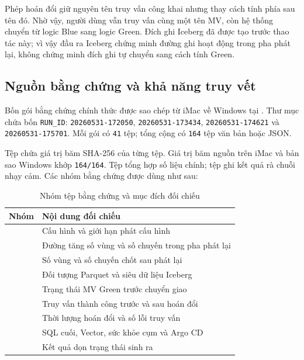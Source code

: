 Phép hoán đổi giữ nguyên tên truy vấn công khai nhưng thay cách tính phía sau tên đó. Nhờ vậy, người dùng vẫn truy vấn cùng một tên MV, còn hệ thống chuyển từ logic Blue sang logic Green. Đích ghi Iceberg đã được tạo trước thao tác này; vì vậy đầu ra Iceberg chứng minh đường ghi hoạt động trong pha phát lại, không chứng minh đích ghi tự chuyển sang cách tính Green.

\subsection{Nguồn bằng chứng và khả năng truy vết}
Bốn gói bằng chứng chính thức được sao chép từ iMac về Windows tại . Thư mục  chứa bốn \texttt{RUN\_ID}: \texttt{20260531-172050}, \texttt{20260531-173434}, \texttt{20260531-174621} và \texttt{20260531-175701}. Mỗi gói có \texttt{41} tệp; tổng cộng có \texttt{164} tệp văn bản hoặc JSON.

Tệp  chứa giá trị băm SHA-256 của từng tệp. Giá trị băm nguồn trên iMac và bản sao Windows khớp \texttt{164/164}. Tệp  tổng hợp số liệu chính; tệp  ghi kết quả rà chuỗi nhạy cảm. Các nhóm bằng chứng được dùng như sau:

\begin{table}[H]
\centering
\caption{Nhóm tệp bằng chứng và mục đích đối chiếu}
\begin{tabularx}{\textwidth}{@{}p{}Y@{}}
\toprule
\textbf{Nhóm} & \textbf{Nội dung đối chiếu}\\
\midrule
{} & Cấu hình và giới hạn phát cấu hình\\
 & Đường tăng số vùng và số chuyến trong pha phát lại\\
 & Số vùng và số chuyến chốt sau phát lại\\
 & Đối tượng Parquet và siêu dữ liệu Iceberg\\
 & Trạng thái MV Green trước chuyển giao\\
 & Truy vấn thành công trước và sau hoán đổi\\
 & Thời lượng hoán đổi và số lỗi truy vấn\\
 & SQL cuối, Vector, sức khỏe cụm và Argo CD\\
 & Kết quả dọn trạng thái sinh ra\\
\bottomrule
\end{tabularx}
\end{table}
